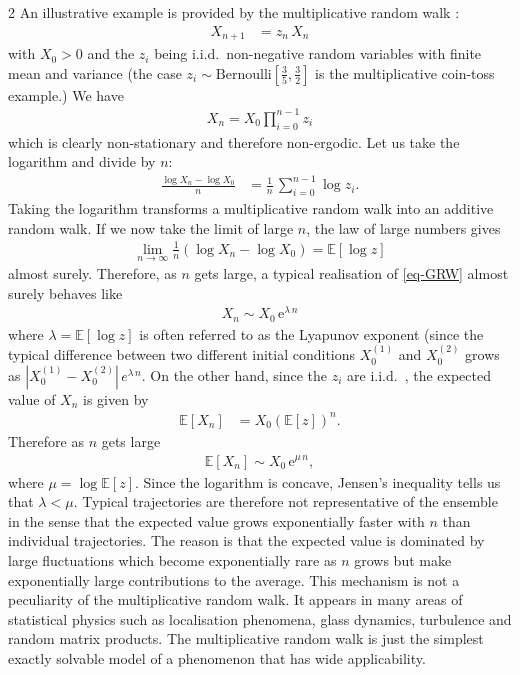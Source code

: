 \documentclass[11pt]{article}
\begin{document}
\begin{multicols}{2}
An illustrative example is provided by the multiplicative random walk \cite{redner1990random}:
\begin{align}
\label{eq-GRW}
X_{n+1} &= z_n\,X_n
\end{align}
with $X_0 >0$ and the $z_i$ being i.i.d.\  non-negative random variables with finite mean and variance (the case $z_i \sim \text{Bernoulli}\left[\frac{3}{5}, \frac{3}{2}\right]$ is the multiplicative coin-toss example.)
We have
\begin{align}
X_n = X_0 \prod_{i=0}^{n-1} z_i
\end{align}
which is clearly non-stationary and therefore non-ergodic.
Let us take the logarithm and divide by $n$:
\begin{align}
\frac{\log{X_n} - \log{X_0}}{n} & = \frac{1}{n} \, \sum_{i=0}^{n-1} \log{z_i}.
\end{align}
Taking the logarithm transforms a multiplicative random walk into an additive random walk.
If we now take the limit of large $n$, the law of large numbers gives
\begin{align}
\label{eq-limlogGRW}
\lim_{n\to\infty} \frac{1}{n} \left( \log X_n  - \log X_0\right) = \mathbb{E} \left[ \log z \right]
\end{align}
almost surely.
Therefore, as $n$ gets large, a typical realisation of \eqref{eq-GRW} almost surely behaves like
\begin{align}
\label{eq-GRW-typical}
X_n \sim X_0\, \mathrm{e}^{\lambda\,n}
\end{align}
where $\lambda =\mathbb{E} \left[ \log z \right]$ is often referred to as the Lyapunov exponent (since the typical difference between two different initial conditions $X_0^{(1)}$ and $X_0^{(2)}$ grows as
$\left| X_0^{(1)} - X_0^{(2)} \right|\, e^{\lambda \, n}$.
On the other hand, since the $z_i$ are i.i.d.\ , the expected value of $X_n$ is given by
\begin{align}
\mathbb{E}\left[ X_n \right] & = X_0 \left(\mathbb{E}\left[ z \right] \right)^n.
\end{align}
Therefore as $n$ gets large
\begin{align}
\mathbb{E}\left[ X_n \right] \sim X_0 \, \mathrm{e}^{\mu\, n},
\end{align}
where $\mu = \log \mathbb{E}\left[ z \right]$.
Since the logarithm is concave, Jensen's inequality tells us that $\lambda < \mu$.
Typical trajectories are therefore not representative of the ensemble in the sense that the expected value grows exponentially faster with $n$ than individual trajectories.
The reason is that the expected value is dominated by large fluctuations which become exponentially rare as $n$ grows but make exponentially large contributions to the average.
This mechanism is not a peculiarity of the multiplicative random walk.
It appears in many areas of statistical physics such as localisation phenomena, glass dynamics, turbulence and random matrix products.
The multiplicative random walk is just the simplest exactly solvable model of a phenomenon that has wide applicability.


\end{multicols}
\end{document}
